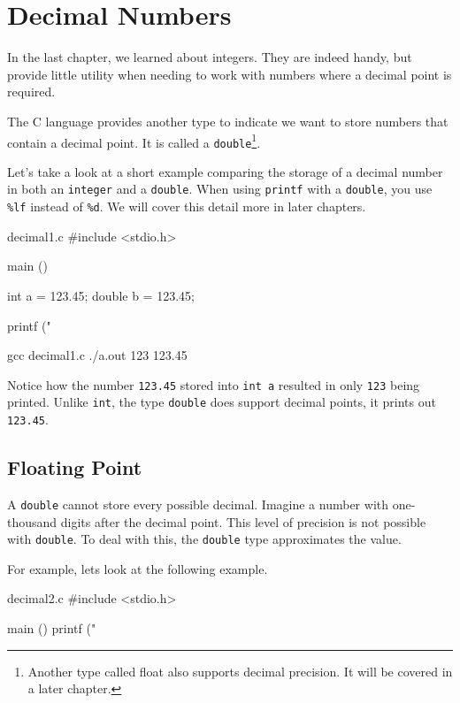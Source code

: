 \chapter{Decimal Numbers}

In the last chapter, we learned about integers. They are indeed handy, but
provide little utility when needing to work with numbers where a decimal point
is required.

The C language provides another type to indicate we want to store numbers that
contain a decimal point. It is called a \verb|double|\footnote{Another type
called float also supports decimal precision. It will be covered in a later
chapter.}.

Let's take a look at a short example comparing the storage of a decimal number
in both an \verb|integer| and a \verb|double|. When using \verb|printf| with a
\verb|double|, you use \verb|%lf| instead of \verb|%d|. We will cover this
detail more in later chapters.

\begin{code}{decimal1.c}
#include <stdio.h>

main ()
{
    int a = 123.45;
    double b = 123.45;

    printf ("%
}
\end{code}

\begin{Terminal}
gcc decimal1.c
./a.out
123 123.45
\end{Terminal}

Notice how the number \verb|123.45| stored into \verb|int a| resulted in only
\verb|123| being printed. Unlike \verb|int|, the type \verb|double| does
support decimal points, it prints out \verb|123.45|.


\section{Floating Point}

A \verb|double| cannot store every possible decimal. Imagine a number with
one-thousand digits after the decimal point. This level of precision is not
possible with \verb|double|. To deal with this, the \verb|double| type
approximates the value.

For example, lets look at the following example.

\begin{code}{decimal2.c}
#include <stdio.h>

main ()
{
    printf ("%
}
\end{code}

